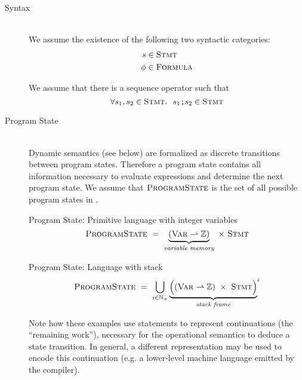 \begin{description}
\item[Syntax]~\\
    We assume the existence of the following two syntactic categories:
    \begin{align*}
    	s    & \in \textup{\textsc{Stmt}}    \\
    	\phi & \in \textup{\textsc{Formula}}
    \end{align*}
    
    We assume that there is a sequence operator \ttt{;} such that $$\forall s_1, s_2 \in \textup{\textsc{Stmt}}.~~ s_1\textup{\texttt{;}}s_2 \in \textup{\textsc{Stmt}}$$
    
\item[Program State]~\\
    Dynamic semantics (see below) are formalized as discrete transitions between program states.
    Therefore a program state contains all information necessary to evaluate expressions and determine the next program state.
    We assume that $\textup{\textsc{ProgramState}}$ is the set of all possible program states in \svl.
    
    \begin{example}{Program State: Primitive language with integer variables}
        \label{ex:ps-primitive}
        \begin{displaymath}
        \textup{\textsc{ProgramState}} ~=~ \underbrace{(\textup{\textsc{Var}} \rightharpoonup \mathbb{Z})}_{\textit{variable memory}} ~\times~ \textup{\textsc{Stmt}} 
        \end{displaymath}
    \end{example}
    \begin{example}{Program State: Language with stack}
        \label{ex:ps-stacked}
        \begin{displaymath}
        \textup{\textsc{ProgramState}} ~=~ \bigcup_{i \in \mathbb{N}_+}{\underbrace{\Big((\textup{\textsc{Var}} \rightharpoonup \mathbb{Z}) ~\times~ \textup{\textsc{Stmt}} \Big)}_{\textit{stack frame}}}^i                                                      
        \end{displaymath}
    \end{example}
    
    Note how these examples use statements to represent continuations (the “remaining work”), necessary for the operational semantics to deduce a state transition.
    In general, a different representation may be used to encode this continuation (e.g. a lower-level machine language emitted by the compiler).
    
    \begin{comment}
    In order to determine the next program state (or detect termination), a state must have a notion of “upcoming work”, usually represented by a statement internally.
    

\end{comment}
\end{description}
